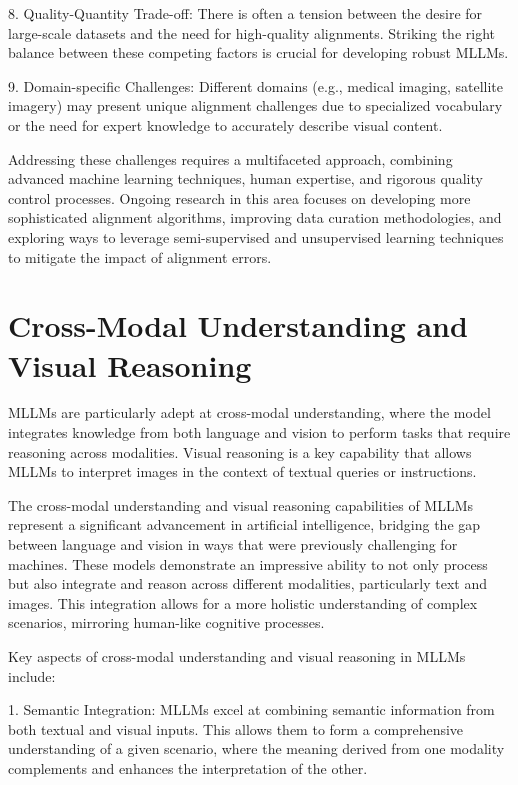 8. Quality-Quantity Trade-off: There is often a tension between the desire for large-scale datasets and the need for high-quality alignments. Striking the right balance between these competing factors is crucial for developing robust MLLMs.

9. Domain-specific Challenges: Different domains (e.g., medical imaging, satellite imagery) may present unique alignment challenges due to specialized vocabulary or the need for expert knowledge to accurately describe visual content.

Addressing these challenges requires a multifaceted approach, combining advanced machine learning techniques, human expertise, and rigorous quality control processes. Ongoing research in this area focuses on developing more sophisticated alignment algorithms, improving data curation methodologies, and exploring ways to leverage semi-supervised and unsupervised learning techniques to mitigate the impact of alignment errors.



\section{Cross-Modal Understanding and Visual Reasoning}

MLLMs are particularly adept at cross-modal understanding, where the model integrates knowledge from both language and vision to perform tasks that require reasoning across modalities. Visual reasoning is a key capability that allows MLLMs to interpret images in the context of textual queries or instructions.

The cross-modal understanding and visual reasoning capabilities of MLLMs represent a significant advancement in artificial intelligence, bridging the gap between language and vision in ways that were previously challenging for machines. These models demonstrate an impressive ability to not only process but also integrate and reason across different modalities, particularly text and images. This integration allows for a more holistic understanding of complex scenarios, mirroring human-like cognitive processes.

Key aspects of cross-modal understanding and visual reasoning in MLLMs include:

1. Semantic Integration: MLLMs excel at combining semantic information from both textual and visual inputs. This allows them to form a comprehensive understanding of a given scenario, where the meaning derived from one modality complements and enhances the interpretation of the other.

